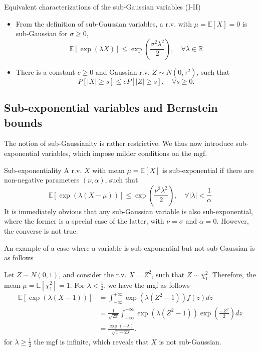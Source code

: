 \documentclass[10pt,handout,english]{beamer}
\newcommand{\E}{\mathbb{E}}
\begin{document}
\begin{frame}
\begin{block}{Equivalent characterizations of the sub-Gaussian variables (I-II)}
\begin{itemize}
\item[(I)] From the definition of sub-Gaussian variables, a r.v. with $\mu=\E[X]=0$ is sub-Gaussian for $\sigma\geq 0$,
\[
\E[\exp(\lambda X)]\leq\exp\left(\frac{\sigma^2\lambda^2}{2}\right),\quad\forall\lambda\in\mathbb{R}
\]
\item[(II)] There is a constant $c\geq 0$ and Gaussian r.v. $Z\sim N(0,\tau^2)$, such that
\[
P[\lvert X\rvert\geq s]\leq cP[\lvert Z\rvert\geq s],\quad\forall s\geq0.
\]
\end{itemize}
\end{block}
\end{frame}
\subsection{Sub-exponential variables and Bernstein bounds}
\begin{frame}
The notion of sub-Gaussianity is rather restrictive. We thus now introduce sub-exponential variables, which impose milder conditions on the mgf.
\begin{definition}{Sub-exponentiality}
A r.v. $X$ with mean $\mu=\E[X]$ is sub-exponential if there are non-negative parameters $(\nu,\alpha)$, such that
\[
\E[\exp(\lambda(X-\mu))]\leq\exp\left(\frac{\nu^2\lambda^2}{2}\right),\quad\forall \lvert\lambda\rvert<\frac{1}{\alpha}
\]
It is immediately obvious that any sub-Gaussian variable is also sub-exponential, where the former is a special case of the latter, with $\nu=\sigma$ and $\alpha=0$. However, the converse is not true. 
\end{definition}
An example of a case where a variable is sub-exponential but not sub-Gaussian is as follows
\end{frame}

\begin{frame}
\begin{example}
Let $Z\sim N(0,1)$, and consider the r.v. $X=Z^2$, such that $Z\sim \chi^2_1$. Therefore, the mean $\mu=\E[\chi_1^2]=1$. For $\lambda<\frac{1}{2}$, we have the mgf as follows
\begin{align*}
\E[\exp(\lambda(X-1))]&=\int_{-\infty}^{+\infty}\exp(\lambda(Z^2-1))f(z)dz\\
&=\frac{1}{\sqrt{2\pi}}\int_{-\infty}^{+\infty}\exp(\lambda(Z^2-1))\exp\left(\frac{-Z^2}{2}\right)dz\\
&=\frac{\exp(-\lambda)}{\sqrt{1-2\lambda}}.
\end{align*}
for $\lambda\geq\frac{1}{2}$ the mgf is infinite, which reveals that $X$ is not sub-Gaussian.
\end{example}
\end{frame}
\end{document}
